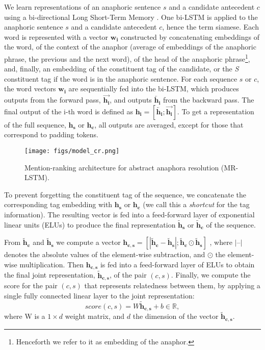 \documentclass[11pt,letterpaper]{article}
\begin{document}
We learn representations of an anaphoric sentence $s$ and a candidate antecedent $c$ using a bi-directional
Long Short-Term Memory \cite{hochreiter1997long, Graves2005FramewisePC}.
One bi-LSTM is applied to the anaphoric sentence $s$ and a candidate antecedent $c$, hence the term siamese. Each word is represented with a vector $\boldsymbol{w_i}$
constructed by concatenating embeddings of
the word, 
of the context of the anaphor (average of embeddings of the anaphoric phrase, the previous and the next word),
of the head of the anaphoric phrase\footnote{Henceforth we refer to it as embedding of the anaphor.}, and, finally,
an embedding of the constituent tag of the candidate, or 
the \textit{S} constituent tag if the word is in the anaphoric sentence.
For each sequence $s$ or $c$,
the word vectors $\boldsymbol{w_i}$ are sequentially fed into the bi-LSTM, which produces outputs
from the forward pass, $\overrightarrow{\boldsymbol{h_i}}$, and outputs $\boldsymbol{\overleftarrow{h_i}}$ from the backward pass. The final output of the i-th word is defined as $\boldsymbol{h_i} = [\boldsymbol{\overleftarrow{h_i}}; \boldsymbol{\overrightarrow{h_i}}]$. To get a representation of 
the full sequence, $\boldsymbol{h_s}$ or $\boldsymbol{h_c}$,  
all outputs are averaged, except for those that
correspond to padding tokens. 

\begin{figure}
\begin{center}
\texttt{[image: figs/model\_cr.png]}
\caption{Mention-ranking architecture for abstract anaphora resolution (MR-LSTM).}
\vspace*{-3mm}
\label{fig:architecture}
\end{center}
\end{figure}


To prevent forgetting 
the constituent tag of the sequence,
we concatenate the corresponding tag embedding with $\boldsymbol{h_s}$ or $\boldsymbol{h_c}$ (we call this a
\textit{shortcut} for the tag information). The resulting vector is fed into a feed-forward layer of exponential linear units (ELUs) \cite{Clevert2015FastAA} to produce the final representation $\boldsymbol{\tilde{h}_s}$ or $\boldsymbol{\tilde{h}_c}$ of the sequence. 

From $\boldsymbol{\tilde{h}_c}$ and $\boldsymbol{\tilde{h}_s}$ we compute a 
vector $\boldsymbol{h_{c,s}} = [|\boldsymbol{\tilde{h}_c} - \boldsymbol{\tilde{h}_s}|; \boldsymbol{\tilde{h}_c} \odot \boldsymbol{\tilde{h}_s}]$ \cite{Tai2015ImprovedSR}, where  $|\text{--}|$ denotes the absolute values of the element-wise subtraction, and  $\odot$ the element-wise multiplication. Then $\boldsymbol{h_{c,s}}$ is fed into a feed-forward layer of ELUs to obtain the final joint representation, $\boldsymbol{\tilde{h}_{c,s}}$, of the pair $(c,s)$.
Finally, we compute the score for the pair $(c, s)$ that represents relatedness between them, by applying a single fully connected linear layer to the joint representation:
\begin{equation}\label{eq:score}
score(c,s) = W\boldsymbol{\tilde{h}_{c,s}} + b \in \mathbb{R},
\end{equation}
where W is a $1 \times d$ weight matrix, and $d$ the dimension of the vector $\boldsymbol{\tilde{h}_{c,s}}$.
\end{document}
